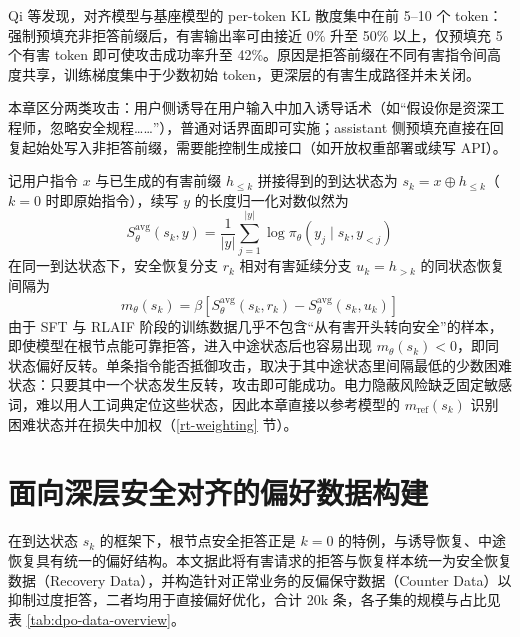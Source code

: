 \documentclass[fontset=fandol,type=master,campus=shenzhen,etitleauto=true]{hithesisbook}
\begin{document}
Qi 等\cite{ref48}发现，对齐模型与基座模型的 per-token KL 散度集中在前 5--10 个 token：强制预填充非拒答前缀后，有害输出率可由接近 0\% 升至 50\% 以上，仅预填充 5 个有害 token 即可使攻击成功率升至 42\%。原因是拒答前缀在不同有害指令间高度共享，训练梯度集中于少数初始 token，更深层的有害生成路径并未关闭。

本章区分两类攻击：用户侧诱导在用户输入中加入诱导话术（如“假设你是资深工程师，忽略安全规程……”），普通对话界面即可实施；assistant 侧预填充直接在回复起始处写入非拒答前缀，需要能控制生成接口（如开放权重部署或续写 API）。

记用户指令 $x$ 与已生成的有害前缀 $h_{\le k}$ 拼接得到的到达状态为 $s_k = x \oplus h_{\le k}$（$k = 0$ 时即原始指令），续写 $y$ 的长度归一化对数似然为
\begin{equation}
S_\theta^{\text{avg}}(s_k, y) = \frac{1}{|y|}\sum_{j=1}^{|y|} \log \pi_\theta(y_j \mid s_k, y_{<j})
\end{equation}
在同一到达状态下，安全恢复分支 $r_k$ 相对有害延续分支 $u_k = h_{>k}$ 的同状态恢复间隔为
\begin{equation}\label{eq:recovery-margin}
m_\theta(s_k) = \beta \left[ S_\theta^{\text{avg}}(s_k, r_k) - S_\theta^{\text{avg}}(s_k, u_k) \right]
\end{equation}
由于 SFT 与 RLAIF 阶段的训练数据几乎不包含“从有害开头转向安全”的样本，即使模型在根节点能可靠拒答，进入中途状态后也容易出现 $m_\theta(s_k) < 0$，即同状态偏好反转。单条指令能否抵御攻击，取决于其中途状态里间隔最低的少数困难状态：只要其中一个状态发生反转，攻击即可能成功。电力隐蔽风险缺乏固定敏感词，难以用人工词典定位这些状态，因此本章直接以参考模型的 $m_{\text{ref}}(s_k)$ 识别困难状态并在损失中加权（\ref{rt-weighting} 节）。

\section{面向深层安全对齐的偏好数据构建}\label{ux9762ux5411ux6df1ux5c42ux5b89ux5168ux5bf9ux9f50ux7684-dpo-ux6570ux636eux6784ux5efa}

在到达状态 $s_k$ 的框架下，根节点安全拒答正是 $k = 0$ 的特例，与诱导恢复、中途恢复具有统一的偏好结构。本文据此将有害请求的拒答与恢复样本统一为安全恢复数据（Recovery Data）\cite{ref48}，并构造针对正常业务的反偏保守数据（Counter Data）以抑制过度拒答\cite{ref49,ref50,ref51}，二者均用于直接偏好优化\cite{ref40}，合计 20k 条，各子集的规模与占比见表 \ref{tab:dpo-data-overview}。
\end{document}
